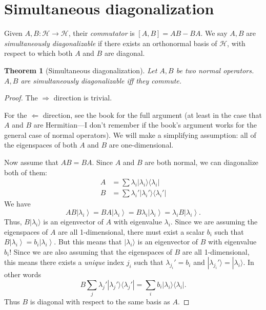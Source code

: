 \documentclass{article}
\newtheorem{theorem}{Theorem}
\newcommand{\ket}[1]{|#1\rangle}
\newcommand{\ketbra}[2]{|#1\rangle\langle #2|}
\begin{document}
\section{Simultaneous diagonalization}



	Given $A, B: \mathscr{H} \to \mathscr{H}$, their \textit{commutator} is $[A, B] = AB - BA$. We say $A, B$ are \textit{simultaneously diagonalizable} if there exists an orthonormal basis of $\mathscr{H}$, with respect to which both $A$ and $B$ are diagonal.

\begin{theorem}[Simultaneous diagonalization]
	\label{thm:SimultaneousDiagonalization}
	Let $A, B$ be two normal operators. $A, B$ are simultaneously diagonalizable iff they commute.
\end{theorem}
\begin{proof}
	The $\Rightarrow$ direction is trivial.

	For the $\Leftarrow$ direction, see the book for the full argument (at least in the case that $A$ and $B$ are Hermitian---I don't remember if the book's argument works for the general case of normal operators).  We will make a simplifying assumption: all of the eigenspaces of both $A$ and $B$ are one-dimensional.

	Now assume that $AB = BA$. Since $A$ and $B$ are both normal, we can diagonalize both of them:
\[ \begin{aligned}
	A &= \sum \lambda_i \ketbra{\lambda_i}{\lambda_i} \\
	B &= \sum \lambda_i' \ketbra{\lambda_i'}{\lambda_i'}
\end{aligned}\]
We have
	\[
		A B \left| \lambda_i \right\rangle 
	= B A \left| \lambda_i \right\rangle 
	= B \lambda_i \left| \lambda_i \right\rangle 
	= \lambda_i B \left| \lambda_i \right\rangle 
	.\] 
Thus, $B \ket{\lambda_i}$ is an eigenvector of $A$ with eigenvalue $\lambda_i$. Since we are assuming the eigenspaces of $A$ are all 1-dimensional, there must exist a scalar $b_i$ such that $B \left| \lambda_i \right\rangle  = b_i \left| \lambda_i \right\rangle $.  But this means that $\ket{\lambda_i}$ is an eigenvector of $B$ with eigenvalue $b_i$!  Since we are also assuming that the eigenspaces of $B$ are all 1-dimensional, this means there exists a \emph{unique} index $j_i$ such that $\lambda_{j_i}' = b_i$ and $\ket{\lambda_{j_i}'} = \ket{\lambda_i}$.  In other words
\[ B \sum_j \lambda_j' \ketbra{\lambda_j'}{\lambda_j'} = \sum_i b_i \ketbra{\lambda_i}{\lambda_i}. \]
Thus $B$ is diagonal with respect to the same basis as $A$.
\end{proof}
\end{document}
